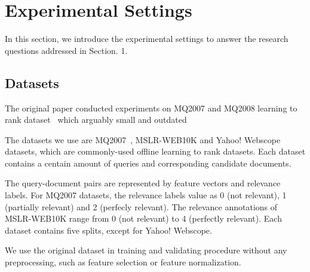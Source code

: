 \section{Experimental Settings}

In this section, we introduce the experimental settings to answer the research questions addressed in Section. 1.

\subsection{Datasets}
The original paper conducted experiments on MQ2007 and MQ2008 learning to rank dataset~\cite{DBLP:journals/corr/QinL13} which arguably small and outdated

The datasets we use are MQ2007~\cite{DBLP:journals/corr/QinL13}, MSLR-WEB10K\cite{DBLP:journals/corr/QinL13} and Yahoo! Webscope~\cite{DBLP:journals/jmlr/ChapelleC11} datasets, which are commonly-used offline learning to rank datasets. Each dataset contains a centain amount of queries and corresponding candidate documents.

The query-document pairs are represented by feature vectors and relevance labels. For MQ2007 datasets, the relevance labels value as 0 (not relevant), 1 (partially relevant) and 2 (perfecly relevant). The relevance annotations of MSLR-WEB10K range from 0 (not relevant) to 4 (perfectly relevant). Each dataset contains five splits, except for Yahoo! Webscope. 


We use the original dataset in training and validating procedure without any preprocessing, such as feature selection or feature normalization.


